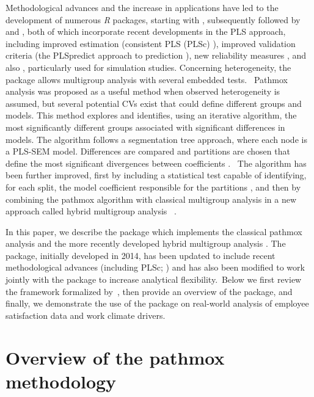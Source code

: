 Methodological advances and the increase in applications have led to the development of numerous  \emph{R} packages, starting with   \citep{plspm}, subsequently followed by   \citep{csem} and   \citep{seminr}, both of which incorporate recent developments in the PLS approach, including improved estimation (consistent PLS  (PLSc) \citealp{Dijkstra15}), improved validation criteria  (the PLSpredict approach to prediction \citealp{Shmueli16,Shmueli19}),  new reliability measures \citep{Dijkstra15, Hair19}, and also  \citep{matpls}, particularly used for simulation studies. Concerning heterogeneity,  the  package allows multigroup analysis with several embedded tests. 
Pathmox analysis \citep{Sanchez06, Lamberti16, Lamberti17}  was proposed as a useful method when observed heterogeneity is assumed, but several potential CVs exist that could define different groups and models. This method explores and identifies, using an iterative algorithm, the most significantly different groups associated with significant differences in models. The algorithm follows a segmentation tree approach, where each node is a PLS-SEM model. Differences are compared and partitions are chosen that define the most significant divergences between coefficients \citep{Lamberti16}.  The algorithm has been further improved, first by including a statistical test capable of identifying, for each split, the model coefficient responsible for the partitions \citep{Lamberti17}, and then by combining the pathmox algorithm with classical multigroup analysis in a new approach called hybrid multigroup analysis  \citep{Lamberti21}. 

In this paper, we describe the  package \citep{genpathmox} which implements the classical pathmox analysis and the more recently developed hybrid multigroup analysis \citep{Lamberti21}. The package, initially developed in 2014,  has been updated to include recent methodological advances (including PLSc;  \citealp{Dijkstra15}) and has also been modified to work jointly with the   package to increase analytical flexibility. Below we first review the framework formalized by \citet{Lamberti16}, then provide an overview of the  package, and finally, we demonstrate the use of the package on real-world analysis of employee satisfaction data and work climate drivers.

\section{Overview of the pathmox methodology}

